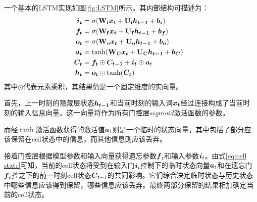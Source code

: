 一个基本的LSTM实现如图\ref{fig:LSTM}所示。其内部结构可描述为：
\begin{align}
    \boldsymbol{i_t} &= \sigma(\boldsymbol{\mathbf{W_i}}\boldsymbol{x_t} + \boldsymbol{\mathbf{U_i}}\boldsymbol{h_{t-1}} + \boldsymbol{b_i})
    \label{eq:lstm_i}\\
    \boldsymbol{f_t} &= \sigma(\boldsymbol{\mathbf{W_f}}\boldsymbol{x_t} + \boldsymbol{\mathbf{U_f}}\boldsymbol{h_{t-1}} + \boldsymbol{b_f})\\
    \boldsymbol{o_t} &= \sigma(\boldsymbol{\mathbf{W_o}}\boldsymbol{x_t} + \boldsymbol{\mathbf{U_o}}\boldsymbol{h_{t-1}} + \boldsymbol{b_o})\\
    \boldsymbol{a_t} &= \tanh(\boldsymbol{\mathbf{W_C}}\boldsymbol{x_t} + \boldsymbol{\mathbf{U_C}}\boldsymbol{h_{t-1}} + \boldsymbol{b_C})\\
    \boldsymbol{C_t} &= \boldsymbol{f_t}\odot\boldsymbol{C_{t-1}} +
                    \boldsymbol{i_t}\odot\boldsymbol{a}_t
                    \label{eq:cell state}\\
    \boldsymbol{h_t} &= \boldsymbol{o_t} \odot \tanh(\boldsymbol{C_t})\label{eq:lstm_C}
\end{align}
其中$\odot$代表元素乘积，其结果仍是一个固定维度的实向量。

首先，上一时刻的隐藏层状态$\boldsymbol{h_{t-1}}$和当前时刻的输入词$\boldsymbol{x_t}$经过连接构成了当前时刻的输入信息向量。这一向量将作为所有门控层$sigmoid$激活函数的参数。

而经$\tanh$激活函数获得的激活值$\boldsymbol{a}_t$则是一个临时的状态向量，其中包括了部分应该保留在cell状态中的信息，而其他信息则应该丢弃。

接着门控层根据模型参数和输入向量获得遗忘参数$\boldsymbol{f}_t$和输入参数$\boldsymbol{i}_t$。由式\ref{eq:cell state}可知，当前的cell状态将受到在输入门$\boldsymbol{i}_t$控制下的临时状态向量$\boldsymbol{a}_t$和在遗忘门$\boldsymbol{f}_t$控之下的前一时刻cell状态$\boldsymbol{C}_{t-1}$的共同影响。它们综合决定临时状态与历史状态中哪些信息应该得到保留，哪些信息应该丢弃。最终两部分保留的结果相加确定当前的cell状态。

